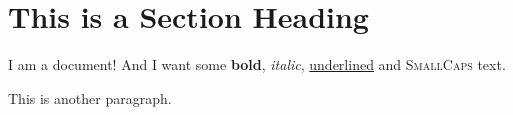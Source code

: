 \documentclass[a4paper, 12pt]{article}
\begin{document}
  \section{This is a Section Heading}
  I am a document! And I want some 
  \textbf{bold}, \textit{italic}, 
  \underline{underlined} and 
  \textsc{SmallCaps} text.

  This is another paragraph.
\end{document}
